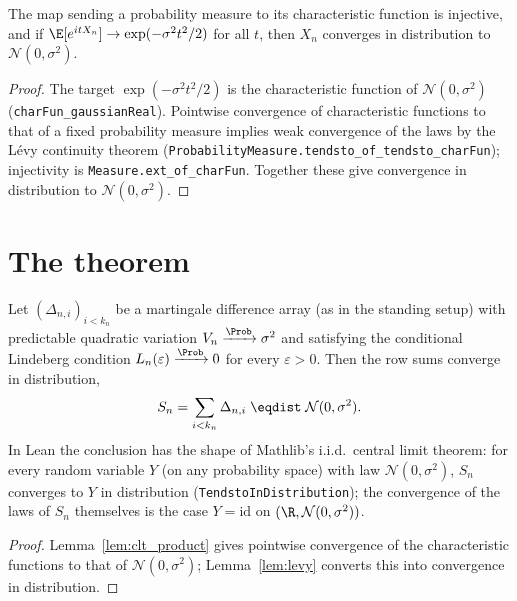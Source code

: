 \begin{lemma}\label{lem:levy}
The map sending a probability measure to its characteristic function is injective,
and if $\E[e^{itX_n}]\to\exp(-\sigma^2 t^2/2)$ for all $t$, then $X_n$ converges in
distribution to $\mathcal{N}(0,\sigma^2)$.
\end{lemma}

\begin{proof}
The target $\exp(-\sigma^2 t^2/2)$ is the characteristic function of
$\mathcal N(0,\sigma^2)$ (\texttt{charFun\_gaussianReal}). Pointwise convergence
of characteristic functions to that of a fixed probability measure implies weak
convergence of the laws by the L\'evy continuity theorem
(\texttt{ProbabilityMeasure.tendsto\_of\_tendsto\_charFun}); injectivity is
\texttt{Measure.ext\_of\_charFun}. Together these give convergence in distribution
to $\mathcal N(0,\sigma^2)$.
\end{proof}

\section{The theorem}
\label{sec:pre_clt_thm}

\begin{theorem}\label{thm:mart_clt}
\leanok
{}
Let $(\Delta_{n,i})_{i<k_n}$ be a martingale difference array (as in the standing
setup) with predictable quadratic variation $V_n\xrightarrow{\Prob}\sigma^2$ and
satisfying the conditional Lindeberg condition
$L_n(\varepsilon)\xrightarrow{\Prob}0$ for every $\varepsilon>0$. Then the row sums
converge in distribution,
\[
  S_n=\sum_{i<k_n}\Delta_{n,i} \;\eqdist\; \mathcal{N}(0,\sigma^2).
\]
In Lean the conclusion has the shape of Mathlib's i.i.d.\ central limit theorem: for every random
variable $Y$ (on any probability space) with law $\mathcal N(0,\sigma^2)$, $S_n$ converges to $Y$
in distribution (\texttt{TendstoInDistribution}); the convergence of the laws of $S_n$ themselves
is the case $Y=\mathrm{id}$ on $(\R,\mathcal N(0,\sigma^2))$.
\end{theorem}

\begin{proof}\leanok
{}
Lemma~\ref{lem:clt_product} gives pointwise convergence of the characteristic
functions to that of $\mathcal N(0,\sigma^2)$; Lemma~\ref{lem:levy} converts this
into convergence in distribution.
\end{proof}

